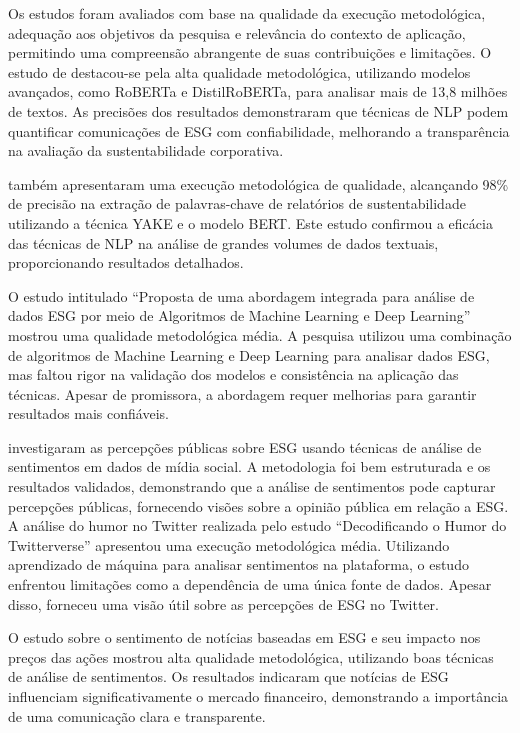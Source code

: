 Os estudos foram avaliados com base na qualidade da execução metodológica, adequação aos
objetivos da pesquisa e relevância do contexto de aplicação, permitindo uma compreensão
abrangente de suas contribuições e limitações. O estudo de \citeauthor{schimanski2024}
\citeyear{schimanski2024} destacou-se pela alta qualidade metodológica, utilizando modelos
avançados, como \gls{RoBERTa} e DistilRoBERTa, para analisar mais de 13,8 milhões de textos.
As precisões dos resultados demonstraram que técnicas de NLP podem quantificar comunicações de
ESG com confiabilidade, melhorando a transparência na avaliação da sustentabilidade corporativa.

\citeauthor{gupta2024} \citeyear{gupta2024} também apresentaram uma execução
metodológica de qualidade, alcançando 98\% de precisão na extração de palavras-chave de
relatórios de sustentabilidade utilizando a técnica YAKE e o modelo \gls{BERT}. Este estudo
confirmou a eficácia das técnicas de NLP na análise de grandes volumes de dados textuais,
proporcionando resultados detalhados.

O estudo intitulado ``Proposta de uma abordagem integrada para análise de dados ESG por
meio de Algoritmos de Machine Learning e Deep Learning'' mostrou uma qualidade metodológica
média. A pesquisa utilizou uma combinação de algoritmos de Machine Learning e Deep Learning
para analisar dados ESG, mas faltou rigor na validação dos modelos e consistência na aplicação das
técnicas. Apesar de promissora, a abordagem requer melhorias para garantir resultados mais
confiáveis.

\citeauthor{liu2023esg} \citeyear{liu2023esg} investigaram as percepções públicas sobre ESG
usando técnicas de análise de sentimentos em dados de mídia social. A metodologia foi bem
estruturada e os resultados validados, demonstrando que a análise de sentimentos pode capturar
percepções públicas, fornecendo visões sobre a opinião pública em relação a ESG. A análise do
humor no Twitter realizada pelo estudo ``Decodificando o Humor do Twitterverse'' apresentou uma
execução metodológica média. Utilizando aprendizado de máquina para analisar sentimentos na
plataforma, o estudo enfrentou limitações como a dependência de uma única fonte de dados.
Apesar disso, forneceu uma visão útil sobre as percepções de ESG no Twitter.

O estudo sobre o sentimento de notícias baseadas em ESG e seu impacto nos preços das
ações mostrou alta qualidade metodológica, utilizando boas técnicas de análise de sentimentos. Os
resultados indicaram que notícias de ESG influenciam significativamente o mercado financeiro,
demonstrando a importância de uma comunicação clara e transparente.

